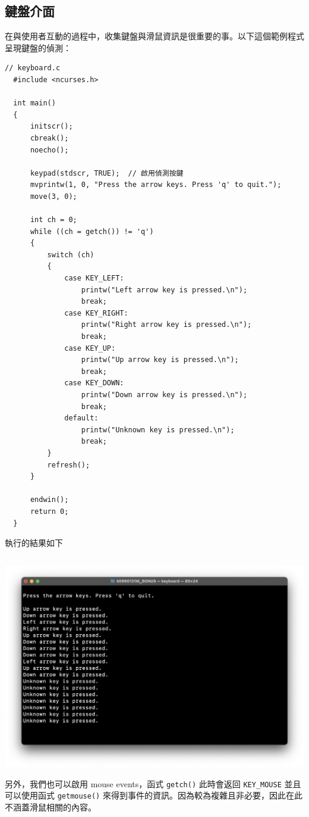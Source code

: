\documentclass[12pt]{article}
\theoremstyle{definition}
\begin{document}
\subsection{鍵盤介面}
\noindent
在與使用者互動的過程中，收集鍵盤與滑鼠資訊是很重要的事。以下這個範例程式呈現鍵盤的偵測：
\begin{lstlisting}[style=C]
  // keyboard.c
  #include <ncurses.h>

  int main()
  {
      initscr();
      cbreak();
      noecho();
    
      keypad(stdscr, TRUE);  // 啟用偵測按鍵
      mvprintw(1, 0, "Press the arrow keys. Press 'q' to quit.");
      move(3, 0);
    
      int ch = 0;
      while ((ch = getch()) != 'q')
      {
          switch (ch)
          {
              case KEY_LEFT:
                  printw("Left arrow key is pressed.\n");
                  break;
              case KEY_RIGHT:
                  printw("Right arrow key is pressed.\n");
                  break;
              case KEY_UP:
                  printw("Up arrow key is pressed.\n");
                  break;
              case KEY_DOWN:
                  printw("Down arrow key is pressed.\n");
                  break;
              default:
                  printw("Unknown key is pressed.\n");
                  break;
          }
          refresh();
      }
    
      endwin();
      return 0;
  }
\end{lstlisting}
執行的結果如下
\begin{lstlisting}[style=zsh]
  % ./keyboard
\end{lstlisting}
\begin{center}
    \includegraphics[width=\textwidth]{keyboard.png}
\end{center}

\newpage
\noindent
另外，我們也可以啟用 mouse events，函式 \texttt{getch()} 此時會返回 \texttt{KEY\_MOUSE} 並且可以使用函式 \texttt{getmouse()} 來得到事件的資訊。因為較為複雜且非必要，因此在此不涵蓋滑鼠相關的內容。

\nocite{ncurses-howto}
\printbibliography
\end{document}
